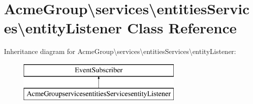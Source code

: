 \hypertarget{class_acme_group_1_1services_1_1entities_services_1_1entity_listener}{\section{Acme\+Group\textbackslash{}services\textbackslash{}entities\+Services\textbackslash{}entity\+Listener Class Reference}
\label{class_acme_group_1_1services_1_1entities_services_1_1entity_listener}
}
Inheritance diagram for Acme\+Group\textbackslash{}services\textbackslash{}entities\+Services\textbackslash{}entity\+Listener\+:\begin{figure}[H]
\begin{center}
\leavevmode
\includegraphics[height=2.000000cm]{class_acme_group_1_1services_1_1entities_services_1_1entity_listener}
\end{center}
\end{figure}
